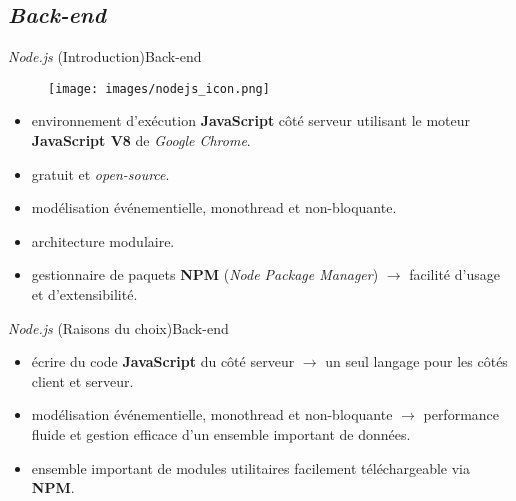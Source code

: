 \documentclass[usenames,dvipsnames]{beamer}
\begin{document}
\subsection{\protect\textit{Back-end}}
\begin{frame}{\textit{Node.js} (Introduction)}{Back-end}
  \begin{figure}[!ht]
    \texttt{[image: images/nodejs\_icon.png]}
  \end{figure}

  \begin{itemize}
    \item environnement d'exécution \textbf{JavaScript} côté serveur utilisant le moteur \textbf{JavaScript V8} de \textit{Google Chrome}.
    \item gratuit et \textit{open-source}.
    \item modélisation événementielle, monothread et non-bloquante.
    \item architecture modulaire.
    \item gestionnaire de paquets \textbf{NPM} (\textit{Node Package Manager}) $\rightarrow$ facilité d'usage et d'extensibilité.
  \end{itemize}
\end{frame}

\begin{frame}{\textit{Node.js} (Raisons du choix)}{Back-end}
  \begin{itemize}
    \item écrire du code \textbf{JavaScript} du côté serveur $\rightarrow$ un seul langage pour les côtés client et serveur.
    \item modélisation événementielle, monothread et non-bloquante $\rightarrow$ performance fluide et gestion efficace d'un ensemble important de données.
    \item ensemble important de modules utilitaires facilement téléchargeable via \textbf{NPM}.
  \end{itemize}
\end{frame}
\end{document}
